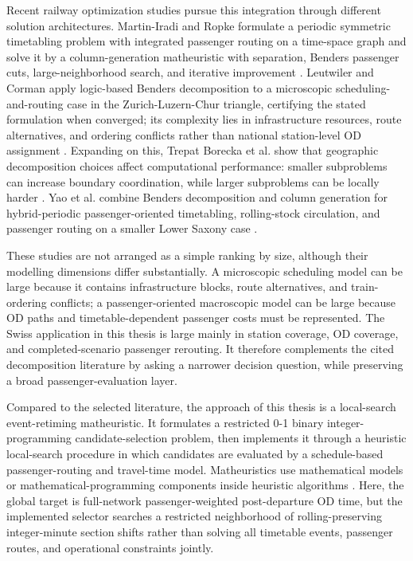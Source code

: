 \documentclass[conference]{IEEEtran}
\begin{document}
Recent railway optimization studies pursue this integration through different solution architectures. Martin-Iradi and Ropke formulate a periodic symmetric timetabling problem with integrated passenger routing on a time-space graph and solve it by a column-generation matheuristic with separation, Benders passenger cuts, large-neighborhood search, and iterative improvement \cite{martinIradiRopke2022Matheuristic}. Leutwiler and Corman apply logic-based Benders decomposition to a microscopic scheduling-and-routing case in the Zurich-Luzern-Chur triangle, certifying the stated formulation when converged; its complexity lies in infrastructure resources, route alternatives, and ordering conflicts rather than national station-level OD assignment \cite{leutwilerCorman2022LogicBenders}. Expanding on this, Trepat Borecka et al. show that geographic decomposition choices affect computational performance: smaller subproblems can increase boundary coordination, while larger subproblems can be locally harder \cite{trepatBoreckaEtAl2025Geographic}. Yao et al. combine Benders decomposition and column generation for hybrid-periodic passenger-oriented timetabling, rolling-stock circulation, and passenger routing on a smaller Lower Saxony case \cite{yaoEtAl2025HybridBenders}.

These studies are not arranged as a simple ranking by size, although their modelling dimensions differ substantially. A microscopic scheduling model can be large because it contains infrastructure blocks, route alternatives, and train-ordering conflicts; a passenger-oriented macroscopic model can be large because OD paths and timetable-dependent passenger costs must be represented. The Swiss application in this thesis is large mainly in station coverage, OD coverage, and completed-scenario passenger rerouting. It therefore complements the cited decomposition literature by asking a narrower decision question, while preserving a broad passenger-evaluation layer.

Compared to the selected literature, the approach of this thesis is a local-search event-retiming matheuristic. It formulates a restricted 0-1 binary integer-programming candidate-selection problem, then implements it through a heuristic local-search procedure in which candidates are evaluated by a schedule-based passenger-routing and travel-time model. Matheuristics use mathematical models or mathematical-programming components inside heuristic algorithms \cite{boschettiManiezzo2022Matheuristics}. Here, the global target is full-network passenger-weighted post-departure OD time, but the implemented selector searches a restricted neighborhood of rolling-preserving integer-minute section shifts rather than solving all timetable events, passenger routes, and operational constraints jointly.
\end{document}

